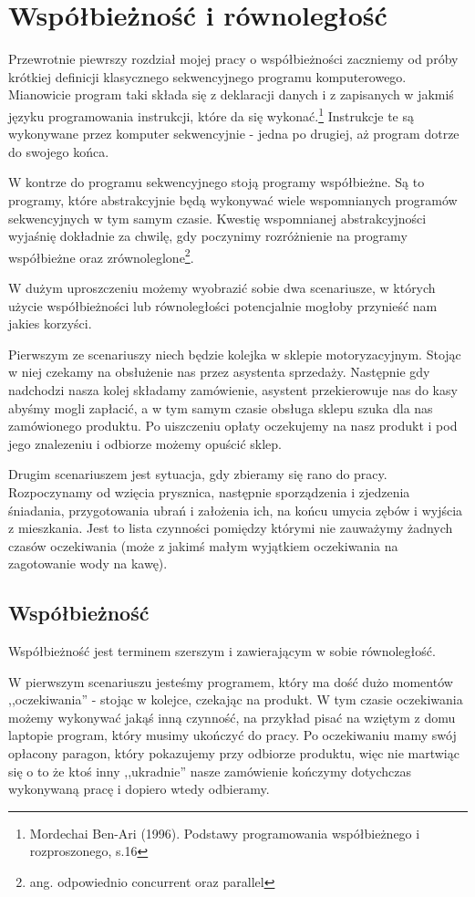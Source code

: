 \chapter{Współbieżność i równoległość}

Przewrotnie piewrszy rozdział mojej pracy o współbieżności zaczniemy od próby krótkiej definicji klasycznego sekwencyjnego programu komputerowego. Mianowicie program taki składa się z deklaracji danych i z zapisanych w jakmiś języku programowania instrukcji, które da się wykonać.\footnote{Mordechai Ben-Ari (1996). Podstawy programowania współbieżnego i rozproszonego, s.16} Instrukcje te są wykonywane przez komputer sekwencyjnie - jedna po drugiej, aż program dotrze do swojego końca.

W kontrze do programu sekwencyjnego stoją programy współbieżne. Są to programy, które abstrakcyjnie będą wykonywać wiele wspomnianych programów sekwencyjnych w tym samym czasie. Kwestię wspomnianej abstrakcyjności wyjaśnię dokładnie za chwilę, gdy poczynimy rozróżnienie na programy współbieżne oraz zrównoleglone\footnote{ang. odpowiednio concurrent oraz parallel}.

W dużym uproszczeniu możemy wyobrazić sobie dwa scenariusze, w których użycie współbieżności lub równoległości potencjalnie mogłoby przynieść nam jakies korzyści.

Pierwszym ze scenariuszy niech będzie kolejka w sklepie motoryzacyjnym. Stojąc w niej czekamy na obsłużenie nas przez asystenta sprzedaży. Następnie gdy nadchodzi nasza kolej składamy zamówienie, asystent przekierowuje nas do kasy abyśmy mogli zapłacić, a w tym samym czasie obsługa sklepu szuka dla nas zamówionego produktu. Po uiszczeniu opłaty oczekujemy na nasz produkt i pod jego znalezeniu i odbiorze możemy opuścić sklep.

Drugim scenariuszem jest sytuacja, gdy zbieramy się rano do pracy. Rozpoczynamy od wzięcia prysznica, następnie sporządzenia i zjedzenia śniadania, przygotowania ubrań i założenia ich, na końcu umycia zębów i wyjścia z mieszkania. Jest to lista czynności pomiędzy którymi nie zauważymy żadnych czasów oczekiwania (może z jakimś małym wyjątkiem oczekiwania na zagotowanie wody na kawę).

\section{Współbieżność}
Współbieżność jest terminem szerszym i zawierającym w sobie równoległość. 

W pierwszym scenariuszu jesteśmy programem, który ma dość dużo momentów ,,oczekiwania'' - stojąc w kolejce, czekając na produkt. W tym czasie oczekiwania możemy wykonywać jakąś inną czynność, na przykład pisać na wziętym z domu laptopie program, który musimy ukończyć do pracy. Po oczekiwaniu mamy swój opłacony paragon, który pokazujemy przy odbiorze produktu, więc nie martwiąc się o to że ktoś inny ,,ukradnie'' nasze zamówienie kończymy dotychczas wykonywaną pracę i dopiero wtedy odbieramy.

